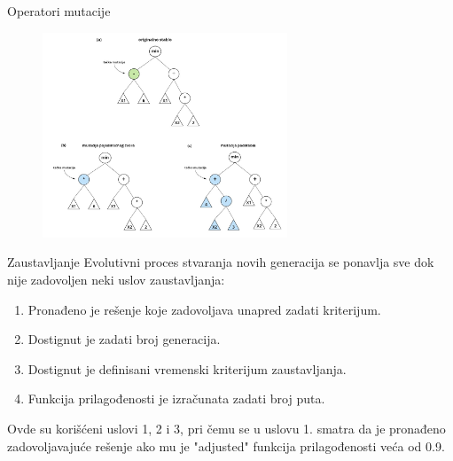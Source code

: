 \documentclass{beamer}
\begin{document}
\begin{frame}{Operatori mutacije}
\begin{enumerate}

\begin{figure}[!ht]
\begin{center}
\includegraphics[width=0.65\textwidth]{images/mutation4.jpg}
\end{center}
\label{fig:mutation}
\end{figure}

\end{enumerate}
\end{frame}

\begin{frame}{Zaustavljanje}
Evolutivni proces stvaranja novih generacija se ponavlja sve dok nije zadovoljen neki uslov zaustavljanja:
\begin{enumerate}
    \item Pronađeno je rešenje koje zadovoljava unapred zadati kriterijum.
    \item Dostignut je zadati broj generacija.
    \item Dostignut je definisani vremenski kriterijum zaustavljanja.
    \item Funkcija prilagođenosti je izračunata zadati broj puta.
\end{enumerate}
Ovde su korišćeni uslovi 1, 2 i 3, pri čemu se u uslovu 1. smatra da je pronađeno zadovoljavajuće rešenje ako mu je "adjusted" funkcija prilagođenosti veća od 0.9. 
\end{frame}
\end{document}
